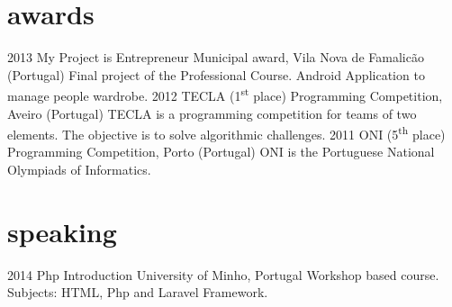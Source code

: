 \documentclass[]{friggeri-cv} %
\begin{document}
\section{awards}

\begin{entrylist}
\entry
{2013}
{My Project is Entrepreneur}
{Municipal award, Vila Nova de Famalicão (Portugal)}
{Final project of the Professional Course. Android Application to manage people wardrobe.}
\entry
{2012}
{TECLA (1\textsuperscript{st} place)}
{Programming Competition, Aveiro (Portugal)}
{TECLA is a programming competition for teams of two elements. The objective is to solve algorithmic challenges.}
\entry
{2011}
{ONI (5\textsuperscript{th} place)}
{Programming Competition, Porto (Portugal)}
{ONI is the Portuguese National Olympiads of Informatics.}

\end{entrylist}


\section{speaking}
\begin{entrylist}
    \entry
    {2014}
    {Php Introduction}
    {University of Minho, Portugal}
    {Workshop based course. Subjects: HTML, Php and Laravel Framework.}
\end{entrylist}

\newpage
\end{document}
